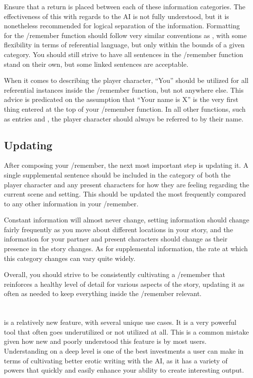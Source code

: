 \documentclass[Source-main.tex]{subfiles}
\begin{document}
Ensure that a return is placed between each of these information categories.
The effectiveness of this with regards to the AI is not fully understood, but it is nonetheless recommended for logical separation of the information.
Formatting for the /remember function should follow very similar conventions as \wi, with some flexibility in terms of referential language, but only within the bounds of a given category.
You should still strive to have all sentences in the /remember function stand on their own, but some linked sentences are acceptable.

When it comes to describing the player character, “You” should be utilized for all referential instances inside the /remember function, but not anywhere else.
This advice is predicated on the assumption that “Your name is X” is the very first thing entered at the top of your /remember function.
In all other functions, such as \wi entries and \an, the player character should always be referred to by their name.

\section{Updating}
\label{sec:updating}

After composing your /remember, the next most important step is updating it.
A single supplemental sentence should be included in the category of both the player character and any present characters for how they are feeling regarding the current scene and setting.
This should be updated the most frequently compared to any other information in your /remember.

Constant information will almost never change, setting information should change fairly frequently as you move about different locations in your story, and the information for your partner and present characters should change as their presence in the story changes.
As for supplemental information, the rate at which this category changes can vary quite widely.

Overall, you should strive to be consistently cultivating a /remember that reinforces a healthy level of detail for various aspects of the story, updating it as often as needed to keep everything inside the /remember relevant.

\chapter{\an}
\label{ch:an}

\an is a relatively new feature, with several unique use cases.
It is a very powerful tool that often goes underutilized or not utilized at all.
This is a common mistake given how new and poorly understood this feature is by most users.
Understanding \an on a deep level is one of the best investments a user can make in terms of cultivating better erotic writing with the AI, as it has a variety of powers that quickly and easily enhance your ability to create interesting output.
\end{document}
